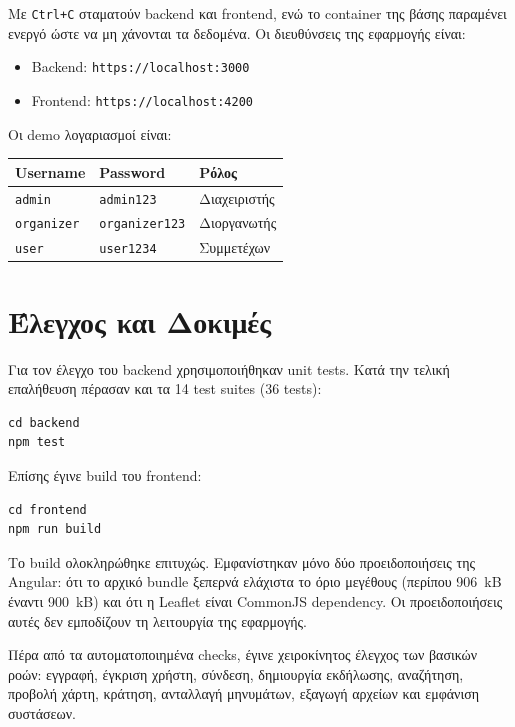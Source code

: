 \documentclass[11pt,a4paper]{article}
\newcommand{\code}[1]{\texttt{#1}}
\begin{document}
Με \code{Ctrl+C} σταματούν backend και frontend, ενώ το container της βάσης παραμένει
ενεργό ώστε να μη χάνονται τα δεδομένα. Οι διευθύνσεις της εφαρμογής είναι:
\begin{itemize}
  \item Backend: \code{https://localhost:3000}
  \item Frontend: \code{https://localhost:4200}
\end{itemize}

Οι demo λογαριασμοί είναι:
\begin{center}
\begin{tabular}{@{}lll@{}}
  \toprule
  \textbf{Username} & \textbf{Password} & \textbf{Ρόλος} \\
  \midrule
  \code{admin}     & \code{admin123}     & Διαχειριστής \\
  \code{organizer} & \code{organizer123} & Διοργανωτής \\
  \code{user}      & \code{user1234}     & Συμμετέχων \\
  \bottomrule
\end{tabular}
\end{center}

\section{Έλεγχος και Δοκιμές}

Για τον έλεγχο του backend χρησιμοποιήθηκαν unit tests. Κατά την τελική επαλήθευση
πέρασαν και τα 14 test suites (36 tests):
\begin{Verbatim}
cd backend
npm test
\end{Verbatim}

Επίσης έγινε build του frontend:
\begin{Verbatim}
cd frontend
npm run build
\end{Verbatim}

Το build ολοκληρώθηκε επιτυχώς. Εμφανίστηκαν μόνο δύο προειδοποιήσεις της Angular: ότι
το αρχικό bundle ξεπερνά ελάχιστα το όριο μεγέθους (περίπου 906~kB έναντι 900~kB) και
ότι η Leaflet είναι CommonJS dependency. Οι προειδοποιήσεις αυτές δεν εμποδίζουν τη
λειτουργία της εφαρμογής.

Πέρα από τα αυτοματοποιημένα checks, έγινε χειροκίνητος έλεγχος των βασικών ροών:
εγγραφή, έγκριση χρήστη, σύνδεση, δημιουργία εκδήλωσης, αναζήτηση, προβολή χάρτη,
κράτηση, ανταλλαγή μηνυμάτων, εξαγωγή αρχείων και εμφάνιση συστάσεων.

\end{document}
